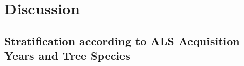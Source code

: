 
\section{Discussion}
\label{sec:regmod:Dis}

\subsection{Stratification according to ALS Acquisition Years and Tree Species}
\label{sec:strat_dis}

